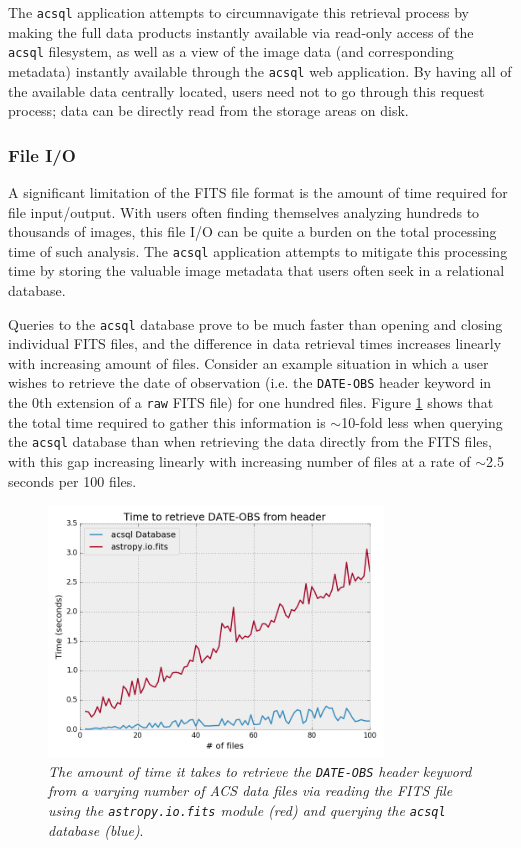 \documentclass[10pt,journal,compsoc]{IEEEtran}
\begin{document}
The \texttt{acsql} application attempts to circumnavigate this retrieval process by making the full data products instantly available via read-only access of
the \texttt{acsql} filesystem, as well as a view of the image data (and corresponding metadata) instantly available through the \texttt{acsql} web application.
By having all of the available data centrally located, users need not to go through this request process; data can be directly read from the storage areas on disk.


\subsubsection{File I/O} \label{sec1.3.2}

A significant limitation of the FITS file format is the amount of time required for file input/output.  With users often finding themselves analyzing hundreds to
thousands of images, this file I/O can be quite a burden on the total processing time of such analysis.  The \texttt{acsql} application attempts to mitigate this
processing time by storing the valuable image metadata that users often seek in a relational database.

Queries to the \texttt{acsql} database prove to be much faster than opening and closing individual FITS files, and the difference in data retrieval times increases
linearly with increasing amount of files.  Consider an example situation in which a user wishes to retrieve the date of observation (i.e. the \texttt{DATE-OBS} header
keyword in the 0th extension of a \texttt{raw} FITS file) for one hundred files. Figure \ref{fig3} shows that the total time required to gather this information
is $\sim$10-fold less when querying the \texttt{acsql} database than when retrieving the data directly from the FITS files, with this gap increasing linearly with
increasing number of files at a rate of $\sim$2.5 seconds per 100 files.

\begin{figure}[!h]
\centering
\includegraphics[width=3.5in]{./figures/fileio_time.png}
\caption{\textit{The amount of time it takes to retrieve the \texttt{DATE-OBS} header keyword from a varying number of ACS data files via reading the FITS file using the
\texttt{astropy.io.fits} module (red) and querying the \texttt{acsql} database (blue)}.}
\label{fig3}
\end{figure}
\end{document}
